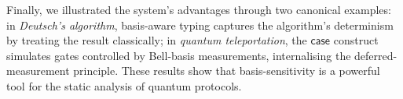 \documentclass[a4paper,UKenglish,numberwithinsect,pdfa,anonymous]{lipics-v2021}
\theoremstyle{restatestyle}
\newcommand{\lambdaB}{\lambda_B}
\newcommand\basis[1]{\ensuremath{\flat_{#1}}}
\begin{document}
Finally, we illustrated the system's advantages through two canonical examples: in \emph{Deutsch's algorithm}, basis-aware typing captures the algorithm's determinism by treating the result classically; in \emph{quantum teleportation}, the $\mathsf{case}$ construct simulates gates controlled by Bell-basis measurements, internalising the deferred-measurement principle. These results show that basis-sensitivity is a powerful tool for the static analysis of quantum protocols.

%
%
%
%
%
%
\end{document}
